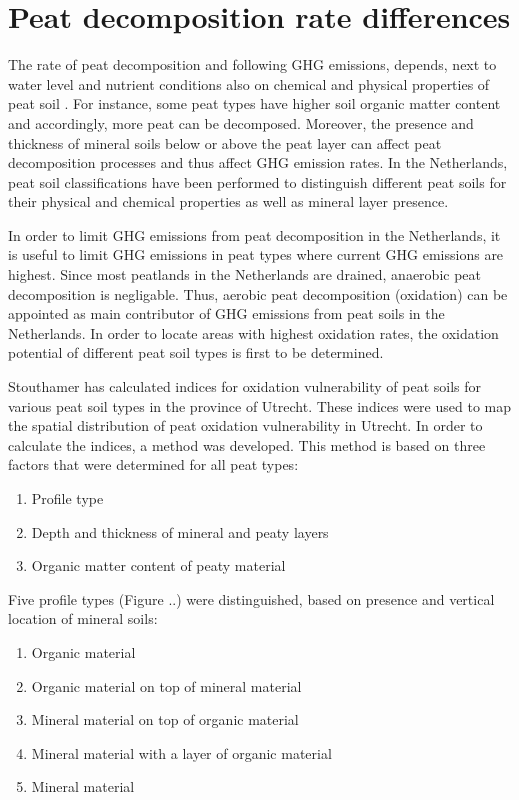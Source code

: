 {\section{Peat decomposition rate differences}
The rate of peat decomposition and following GHG emissions, depends, next to water level and nutrient conditions also on chemical and physical properties of peat soil \citep{}. For instance, some peat types have higher soil organic matter content and accordingly, more peat can be decomposed. Moreover, the presence and thickness of mineral soils below or above the peat layer can affect peat decomposition processes and thus affect GHG emission rates. In the Netherlands, peat soil classifications have been performed to distinguish different peat soils for their physical and chemical properties as well as mineral layer presence. 

In order to limit GHG emissions from peat decomposition in the Netherlands, it is useful to limit GHG emissions in peat types where current GHG emissions are highest. Since most peatlands in the Netherlands are drained, anaerobic peat decomposition is negligable. Thus, aerobic peat decomposition (oxidation) can be appointed as main contributor of GHG emissions from peat soils in the Netherlands. In order to locate areas with highest oxidation rates, the oxidation potential of different peat soil types is first to be determined.

Stouthamer has calculated indices for oxidation vulnerability of peat soils for various peat soil types in the province of Utrecht. These indices were used to map the spatial distribution of peat oxidation vulnerability in Utrecht. In order to calculate the indices, a method was developed. This method is based on three factors that were determined for all peat types: 

\begin{enumerate}
\item Profile type
\item Depth and thickness of mineral and peaty layers
\item Organic matter content of peaty material
\end{enumerate}

Five profile types (Figure ..) were distinguished, based on presence and vertical location of mineral soils:

\begin{enumerate}
\item Organic material
\item Organic material on top of mineral material
\item Mineral material on top of organic material
\item Mineral material with a layer of organic material
\item Mineral material


\end{enumerate}}
